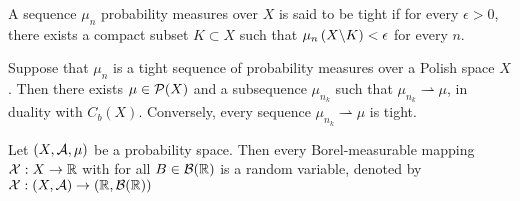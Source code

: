 \begin{definition}
	A sequence $\mu_n$ probability measures over $X$ is said to be tight if for every $\epsilon> 0$, there exists a compact subset $K\subset X$ such that $\mu_n\left( X\backslash K \right)< \epsilon$ for every $n$.
\end{definition}


\begin{theorem}[Prokhorov]
	Suppose that $\mu_n $ is a tight sequence of probability measures over a Polish space $X$. Then there exists $\mu\in\mathcal{P}(X)$ and a subsequence $\mu_{n_k}$ such that $\mu_{n_k}\rightharpoonup \mu $, in duality with $C_b(X)$. Conversely, every sequence $\mu_{n_k}\rightharpoonup \mu$ is tight.
\end{theorem}

\begin{definition}
	Let $\left( X, \mathcal A, \mu \right)$ be a probability space. Then every Borel-measurable mapping $\mathcal{X}: X\rightarrow \mathbb{R}$ with for all $B\in \mathcal B(\mathbb{R}) $ is a random variable, denoted by $\mathcal{X}: \left( X, \mathcal A \right)\rightarrow \left( \mathbb{R}, \mathcal B (\mathbb{R}) \right) $
\end{definition}